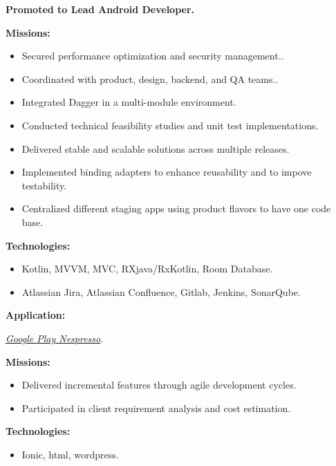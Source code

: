 \documentclass[10pt,a4paper,withhyper]{altacv}
\begin{document}
\begin{paracol}{2}
\divider


\textbf{Promoted to Lead Android Developer.}
\newline

\textbf{Missions:}
\begin{itemize}
\addtolength{\itemindent}{0.1cm}
\item Secured performance optimization and security management..
\item Coordinated with product, design, backend, and QA teams..
\item Integrated Dagger in a multi-module environment.
\item Conducted technical feasibility studies and unit test implementations.
\item Delivered stable and scalable solutions across multiple releases.
\item Implemented binding adapters to enhance reusability and to impove testability.
\item Centralized different staging apps using product flavors to have one code base.
\end{itemize}

\textbf{Technologies:}
\begin{itemize}
	\addtolength{\itemindent}{0.1cm}
	\item Kotlin, MVVM, MVC, RXjava/RxKotlin, Room Database.
	\item Atlassian Jira, Atlassian Confluence, Gitlab, Jenkins, SonarQube.
\end{itemize}
\textbf{Application:}

\href{https://play.google.com/store/apps/details?id=com.nespresso.activities&hl=en}{\textit{Google Play Nespresso}}.

\divider



\textbf{Missions:}
\begin{itemize}
	\addtolength{\itemindent}{0.1cm}
	\item Delivered incremental features through agile development cycles.
	\item Participated in client requirement analysis and cost estimation.
\end{itemize}

\textbf{Technologies:}
\begin{itemize}
	\addtolength{\itemindent}{0.1cm}
	\item Ionic, html, wordpress.
\end{itemize}


\end{paracol}
\end{document}
